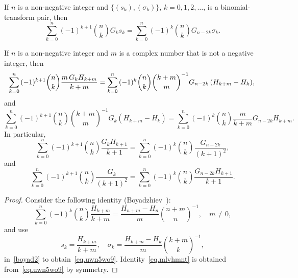 \documentclass[12pt,reqno]{article}
\begin{document}
\begin{lemma}\label{lem.boyad2}
If $n$ is a non-negative integer and $\{(s_k),(\sigma_k)\}$, $k=0,1,2,\dots$, is a binomial-transform pair, then
\begin{equation}\label{boyad2}
\sum_{k = 0}^n {( - 1)^{k + 1} \binom{{n}}{k}G_k s _k }  = \sum_{k = 0}^n {( - 1)^k \binom{{n}}{k}G_{n - 2k} \sigma_k } .
\end{equation}
\end{lemma}
	
\begin{theorem}
If $n$ is a non-negative integer and $m$ is a complex number that is not a negative integer, then
\begin{equation}\label{eq.uwn5wo9}
\sum_{k = 0}^n {( - 1)^{k + 1} \binom{{n}}{k} \frac{{m\,G_k H_{k + m} }}{{k + m}}} 
= \sum_{k = 0}^n {( - 1)^k \binom{{n}}{k}\binom{{k + m}}{m}^{ - 1} G_{n - 2k} \left( {H_{k + m}  - H_k } \right)},\\
\end{equation}
and
\begin{equation}\label{eq.mlvhmnt}
\sum_{k = 0}^n {( - 1)^{k + 1} \binom{{n}}{k}\binom{{k + m}}{m}^{ - 1} G_k \left( {H_{k + m} - H_k } \right)} 
= \sum_{k = 0}^n {( - 1)^k \binom{{n}}{k}\frac{m}{{k + m}}G_{n - 2k} H_{k + m} }. 
\end{equation}
In particular,
\begin{equation}
\sum_{k = 0}^n {( - 1)^{k + 1} \binom{{n}}{k}\frac{{G_k H_{k + 1} }}{{k + 1}}}  
= \sum_{k = 0}^n {( - 1)^k \binom{{n}}{k}\frac{{G_{n - 2k} }}{{\left( {k + 1} \right)^2 }}}, 
\end{equation}
and
\begin{equation}
\sum_{k = 0}^n {( - 1)^{k + 1} \binom{{n}}{k}\frac{{G_k }}{{\left( {k + 1} \right)^2 }}}  
= \sum_{k = 0}^n {( - 1)^k \binom{{n}}{k}\frac{{G_{n - 2k} H_{k + 1} }}{{k + 1}}}.
\end{equation}
\end{theorem}
\begin{proof}
Consider the following identity (Boyadzhiev~\cite[Identity (9.46)]{boyadzhiev18}):
\begin{equation*}
\sum_{k = 0}^n {( - 1)^k \binom{{n}}{k}\frac{{H_{k + m} }}{{k + m}}} = \frac{{H_{n + m} - H_n }}{m}\binom{{n + m}}{n}^{- 1},\quad m\ne 0,
\end{equation*}
and use
\begin{equation*}
s_k = \frac{{H_{k + m} }}{{k + m}},\quad\sigma_k = \frac{{H_{k + m} - H_k }}{m}\binom{{k + m}}{k}^{- 1}, 
\end{equation*}
in~\eqref{boyad2} to obtain~\eqref{eq.uwn5wo9}. Identity~\eqref{eq.mlvhmnt} is obtained from~\eqref{eq.uwn5wo9} by symmetry.
\end{proof}
\end{document}

